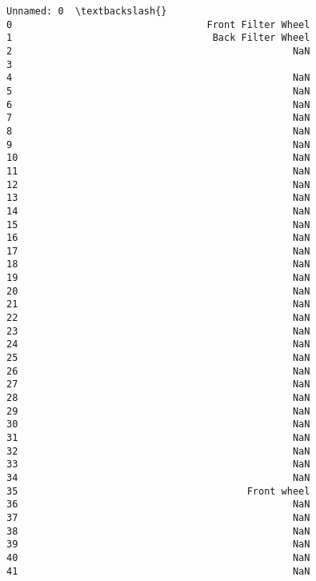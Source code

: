\documentclass[11pt]{article}
\makeatletter
\newcommand{\boxspacing}{\kern\kvtcb@left@rule\kern\kvtcb@boxsep}
\newcommand{\prompt}[4]{
        {\ttfamily\llap{{\color{#2}[#3]:\hspace{3pt}#4}}\vspace{-\baselineskip}}
    }
\makeatother
\begin{document}
            \begin{tcolorbox}[breakable, size=fbox, boxrule=.5pt, pad at break*=1mm, opacityfill=0]
\prompt{Out}{outcolor}{82}{\boxspacing}
\begin{Verbatim}[commandchars=\\\{\}]
                                           Unnamed: 0  \textbackslash{}
0                                  Front Filter Wheel
1                                   Back Filter Wheel
2                                                 NaN
3                                                   ﻿
4                                                 NaN
5                                                 NaN
6                                                 NaN
7                                                 NaN
8                                                 NaN
9                                                 NaN
10                                                NaN
11                                                NaN
12                                                NaN
13                                                NaN
14                                                NaN
15                                                NaN
16                                                NaN
17                                                NaN
18                                                NaN
19                                                NaN
20                                                NaN
21                                                NaN
22                                                NaN
23                                                NaN
24                                                NaN
25                                                NaN
26                                                NaN
27                                                NaN
28                                                NaN
29                                                NaN
30                                                NaN
31                                                NaN
32                                                NaN
33                                                NaN
34                                                NaN
35                                        Front wheel
36                                                NaN
37                                                NaN
38                                                NaN
39                                                NaN
40                                                NaN
41                                                NaN

\end{Verbatim}
\end{tcolorbox}
\end{document}
